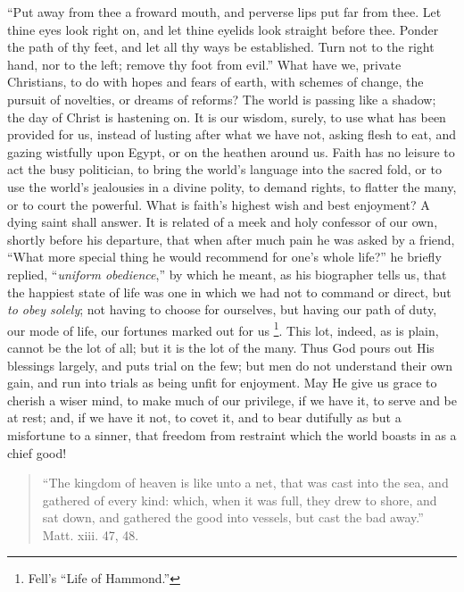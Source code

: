 ``Put away from thee a froward mouth, and perverse lips put far
from thee. Let thine eyes look right on, and let thine eyelids look
straight before thee. Ponder the path of thy feet, and let all thy
ways be established. Turn not to the right hand, nor to the left;
remove thy foot from evil.'' What have we, private Christians, to
do with hopes and fears of earth, with schemes of change, the pursuit
of novelties, or dreams of reforms? The world is passing like a
shadow; the day of Christ is hastening on. It is our wisdom, surely,
to use what has been provided for us, instead of lusting after what
we
have not, asking flesh to eat, and gazing wistfully upon Egypt, or on
the heathen around us. Faith has no leisure to act the busy
politician, to bring the world's language into the sacred fold, or
to use the world's jealousies in a divine polity, to demand rights,
to flatter the many, or to court the powerful. What is faith's
highest wish and best enjoyment? A dying saint shall answer. It is
related of a meek and holy confessor of our own, shortly before his
departure, that when after much pain he was asked by a friend,
``What more special thing he would recommend for one's whole
life?'' he briefly replied, ``\emph{uniform obedience},''
by which he meant, as his biographer tells us, that the happiest state
of life was one in which we had not to command or direct, but \emph{to
obey solely}; not having to choose for ourselves, but having our
path of duty, our mode of life, our fortunes marked out for us \footnote{Fell's ``Life of Hammond.''}.
This lot, indeed, as is plain, cannot be the lot of all; but it is the
lot of the many. Thus God pours out His blessings largely, and puts
trial on the few; but men do not understand their own gain, and run
into trials as being unfit for enjoyment. May He give us grace to
cherish a wiser mind, to make much of our privilege, if we have it, to
serve and be at rest; and, if we have it not, to covet it, and to bear
dutifully as but a misfortune to a sinner, that freedom from restraint
which the world boasts in as a chief good!


\begin{quote}

``The kingdom of heaven is like unto a net, that was cast
into the sea, and gathered of every kind: which, when it was full,
they drew to shore, and sat down, and gathered the good into
vessels, but cast the bad away.'' Matt. xiii. 47, 48.

\end{quote}

